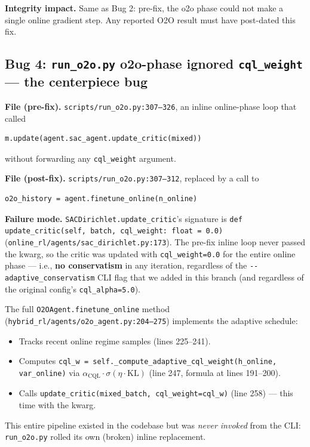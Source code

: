 \textbf{Integrity impact.} Same as Bug 2: pre-fix, the o2o phase could
not make a single online gradient step. Any reported O2O result must
have post-dated this fix.

\subsection{Bug 4: \texttt{run\_o2o.py} o2o-phase ignored
\texttt{cql\_weight} --- the centerpiece bug}
\label{app:impl:cql-weight}

\textbf{File (pre-fix).} \texttt{scripts/run\_o2o.py:307--326}, an
inline online-phase loop that called
\begin{verbatim}
m.update(agent.sac_agent.update_critic(mixed))
\end{verbatim}
without forwarding any \texttt{cql\_weight} argument.

\textbf{File (post-fix).} \texttt{scripts/run\_o2o.py:307--312},
replaced by a call to
\begin{verbatim}
o2o_history = agent.finetune_online(n_online)
\end{verbatim}

\textbf{Failure mode.} \texttt{SACDirichlet.update\_critic}'s signature
is \texttt{def update\_critic(self, batch, cql\_weight: float = 0.0)}
(\texttt{online\_rl/agents/sac\_dirichlet.py:173}). The pre-fix inline
loop never passed the kwarg, so the critic was updated with
\texttt{cql\_weight=0.0} for the entire online phase --- i.e.,
\textbf{no conservatism} in any iteration, regardless of the
\texttt{-{}-adaptive\_conservatism} CLI flag that we added in this
branch (and regardless of the original config's \texttt{cql\_alpha=5.0}).

The full \texttt{O2OAgent.finetune\_online} method
(\texttt{hybrid\_rl/agents/o2o\_agent.py:204--275}) implements the
adaptive schedule:
\begin{itemize}\setlength\itemsep{0pt}
  \item Tracks recent online regime samples (lines 225--241).
  \item Computes
    \texttt{cql\_w = self.\_compute\_adaptive\_cql\_weight(h\_online, var\_online)}
    via $\alpha_{\mathrm{CQL}} \cdot \sigma(\eta \cdot \mathrm{KL})$
    (line 247, formula at lines 191--200).
  \item Calls \texttt{update\_critic(mixed\_batch, cql\_weight=cql\_w)}
    (line 258) --- this time with the kwarg.
\end{itemize}
This entire pipeline existed in the codebase but was \emph{never
invoked} from the CLI: \texttt{run\_o2o.py} rolled its own (broken)
inline replacement.


